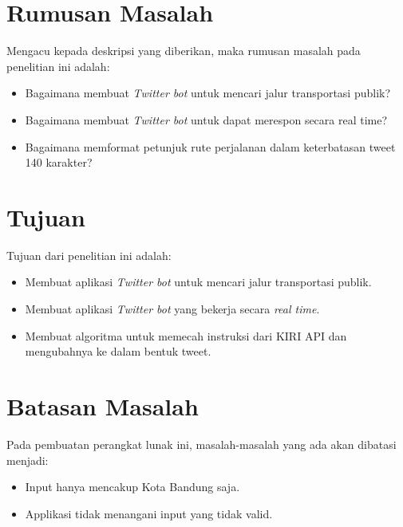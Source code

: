 
\section{Rumusan Masalah}
Mengacu kepada deskripsi yang diberikan, maka rumusan masalah pada penelitian ini adalah:
\begin{itemize}
	\item Bagaimana membuat \textit{Twitter bot} untuk mencari jalur transportasi publik?
	\item Bagaimana membuat \textit{Twitter bot} untuk dapat merespon secara real time?
	\item Bagaimana memformat petunjuk rute perjalanan dalam keterbatasan tweet 140 karakter?
\end{itemize}

\section{Tujuan}
Tujuan dari penelitian ini adalah:
\begin{itemize}
	\item Membuat aplikasi \textit{Twitter bot} untuk mencari jalur transportasi publik.
	\item Membuat aplikasi \textit{Twitter bot} yang bekerja secara \textit{real time}.
	\item Membuat algoritma untuk memecah instruksi dari KIRI API dan mengubahnya ke dalam bentuk tweet.
\end{itemize}

\section{Batasan Masalah}
Pada pembuatan perangkat lunak ini, masalah-masalah yang ada akan dibatasi menjadi:
\begin{itemize}
	\item Input hanya mencakup Kota Bandung saja.
	\item Applikasi tidak menangani input yang tidak valid.
\end{itemize}

